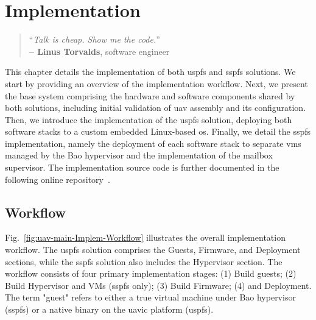 %
\chapter{Implementation}
\label{cha:implementation}
%
\begin{quote}
\begin{flushright}
``\emph{Talk is cheap. Show me the code.}'' \\
\textbf{-- Linus Torvalds}, software engineer
\end{flushright}
\end{quote}

This chapter details the implementation of both \gls{uspfs} and \gls{sspfs}
solutions. We start by providing an overview of the implementation
workflow. Next, we present the base system comprising the  hardware and
software components shared by both solutions, including initial validation of
\gls{uav} assembly and its configuration. Then, we introduce the 
implementation of the \gls{uspfs} solution, deploying both software stacks to a
custom embedded Linux-based \gls{os}. Finally, we detail the \gls{sspfs}
implementation, namely the deployment of each software stack to separate
\glspl{vm} managed by the Bao hypervisor and the implementation of the mailbox
supervisor. The implementation source code is further documented in the
following online repository~\cite{thesis-sw-github}.

\section{Workflow}
\label{sec:workflow}
Fig.~\ref{fig:uav-main-Implem-Workflow} illustrates the overall implementation
workflow. The \gls{uspfs} solution comprises the Guests,
Firmware, and Deployment sections, while the \gls{sspfs}
solution also includes the Hypervisor section. The workflow
consists of four primary implementation stages: (1) Build guests;
(2) Build Hypervisor and VMs (\gls{sspfs} only); (3) Build Firmware; 
(4) and Deployment. The term "guest" refers to either a true virtual
machine under Bao hypervisor (\gls{sspfs}) or a native binary on the \gls{uavic}
platform (\gls{uspfs}).

